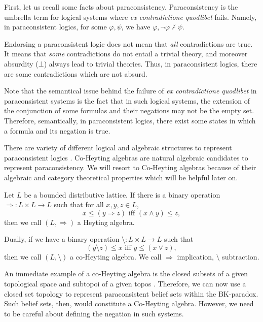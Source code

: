 \documentclass{article}
\begin{document}
First, let us recall some facts about paraconsistency. Paraconsistency is the umbrella term for logical systems where \emph{ex contradictione quodlibet} fails. Namely, in paraconsistent logics, for some $\varphi, \psi$, we have $\varphi, \neg \varphi \not\vdash \psi$. 

Endorsing a paraconsistent logic does not mean that \emph{all} contradictions are true. It means that \emph{some} contradictions do not entail a trivial theory, and moreover absurdity ($\bot$) always lead to trivial theories. Thus, in paraconsistent logics, there are some contradictions which are not absurd.

Note that the semantical issue behind the failure of \emph{ex contradictione quodlibet} in paraconsistent systems is the fact that in such logical systems, the extension of the conjunction of some formulas and their negations may not be the empty set. Therefore, semantically, in paraconsistent logics, there exist some states in which a formula and its negation is true.

There are variety of different logical and algebraic structures to represent paraconsistent logics \cite{pri0}. Co-Heyting algebras are natural algebraic candidates to represent paraconsistency. We will resort to Co-Heyting algebras because of their algebraic and category theoretical properties which will be helpful later on.

\begin{dfn}
Let $L$ be a bounded distributive lattice. If there is a binary operation $\Rightarrow: L \times L \rightarrow L$ such that for all $x, y, z \in L$, $$x \leq (y \Rightarrow z) \text{ iff } (x \wedge y) \leq z,$$
then we call $(L, \Rightarrow)$ a Heyting algebra.

Dually, if we have a binary operation $\setminus: L \times L \rightarrow L$ such that $$(y \setminus z) \leq x \text{ iff } y \leq (x \vee z),$$
then we call $(L, \setminus)$ a co-Heyting algebra. We call $\Rightarrow$ implication, $\setminus$ subtraction.
\end{dfn}

An immediate example of a co-Heyting algebra is the closed subsets of a given topological space and subtopoi of a given topos \cite{law,mor,bas3,pri0}. Therefore, we can now use a closed set topology to represent paraconsistent belief sets within the BK-paradox. Such belief sets, then, would constitute a  Co-Heyting algebra. However, we need to be careful about defining the negation in such systems.
\end{document}
